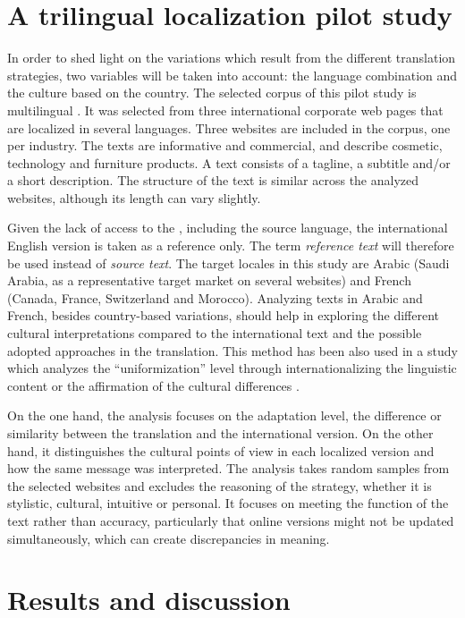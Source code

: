 \documentclass[output=paper]{langsci/langscibook}
\begin{document}
\section{A trilingual localization pilot study}

In order to shed light on the variations which result from the different translation strategies, two variables will be taken into account: the language combination and the culture based on the country. The selected corpus of this pilot study is multilingual \parencite{olohan04}. It was selected from three international corporate web pages that are localized in several languages. Three websites are included in the corpus, one per industry. The texts are informative and commercial, and describe cosmetic, technology and furniture products. A text consists of a tagline, a subtitle and\slash or a short description. The structure of the text is similar across the analyzed websites, although its length can vary slightly.

Given the lack of access to the , including the source language, the international English version is taken as a reference only. The term \textit{reference text} will therefore be used instead of \textit{source text}. The target locales in this study are Arabic (Saudi Arabia, as a representative target market on several websites) and French (Canada, France, Switzerland and Morocco). Analyzing texts in Arabic and French, besides country-based variations, should help in exploring the different cultural interpretations compared to the international text and the possible adopted approaches in the translation. This method has been also used in a study which analyzes the \enquote{uniformization} level through internationalizing the linguistic content or the affirmation of the cultural differences \parencite{boucai06}.

On the one hand, the analysis focuses on the adaptation level, the difference or similarity between the translation and the international version. On the other hand, it distinguishes the cultural points of view in each localized version and how the same message was interpreted. The analysis takes random samples from the selected websites and excludes the reasoning of the strategy, whether it is stylistic, cultural, intuitive or personal. It focuses on meeting the function of the text rather than accuracy, particularly that online versions might not be updated simultaneously, which can create discrepancies in meaning.

\section{Results and discussion}
\end{document}
